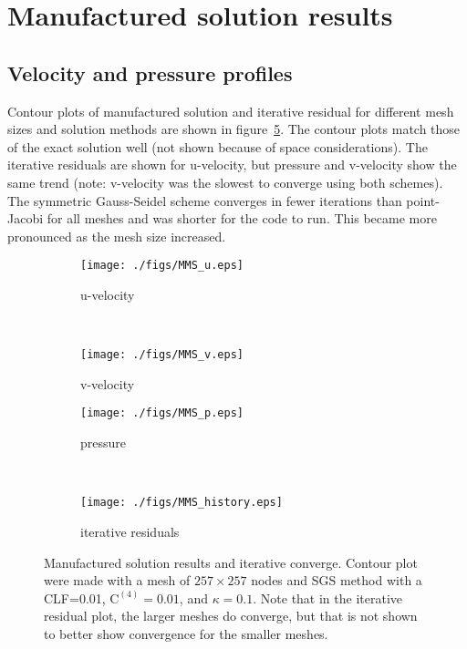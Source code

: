 \documentclass[10pt, letterpaper]{article}
\newcommand{\mesh}[1]{${#1} \times {#1}$}
\begin{document}

\newpage

\section{Manufactured solution results}

\subsection{Velocity and pressure profiles}

Contour plots of manufactured solution and iterative residual for different
mesh sizes and solution methods are shown in figure~\ref{fig:MMS}.  The contour
plots match those of the exact solution well (not shown because of space
considerations).  The iterative residuals are shown for u-velocity, but pressure
and v-velocity show the same trend (note: v-velocity was the slowest to
converge using both schemes).  The symmetric Gauss-Seidel scheme converges in
fewer iterations than point-Jacobi for all meshes and was shorter for the
code to run.  This became more pronounced as the mesh size increased.

\begin{figure}[hb]
	\centering
	\begin{subfigure}[b]{0.475\textwidth}
		\centering
		\texttt{[image: ./figs/MMS\_u.eps]}
		\caption{u-velocity}
		\label{fig:MMS_u}
	\end{subfigure}
	~
	\begin{subfigure}[b]{0.475\textwidth}
		\centering
		\texttt{[image: ./figs/MMS\_v.eps]}
		\caption{v-velocity}
		\label{fig:MMS_v}
	\end{subfigure}
	
	\begin{subfigure}[b]{0.475\textwidth}
		\centering
		\texttt{[image: ./figs/MMS\_p.eps]}
		\caption{pressure}
		\label{fig:MMS_p}
	\end{subfigure}
	~
	\begin{subfigure}[b]{0.475\textwidth}
		\centering
		\texttt{[image: ./figs/MMS\_history.eps]}
		\caption{iterative residuals}
		\label{fig:MMS_history}
	\end{subfigure}
	\caption{Manufactured solution results and iterative converge.  Contour
		plot were made with a mesh of \mesh{257} nodes and SGS method with
		a CLF=0.01, $\mathrm{C^{(4)}} = 0.01$, and $\kappa = 0.1$.
		Note that in the iterative residual plot, the larger meshes do converge, 
		but that is not shown to
		better show convergence for the smaller meshes.}
	\label{fig:MMS}
\end{figure}
\end{document}
